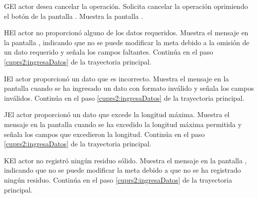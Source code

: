 \begin{UCtrayectoriaA}{G}{El actor desea cancelar la operación.}
	\UCpaso[\UCactor] Solicita cancelar la operación oprimiendo el botón  de la pantalla .
	\UCpaso[\UCsist] Muestra la pantalla  .
\end{UCtrayectoriaA} 

\begin{UCtrayectoriaA}{H}{El actor no proporcionó alguno de los datos requeridos.}
	\UCpaso[\UCsist] Muestra el mensaje  en la pantalla ,
	indicando que no se puede modificar la meta debido a la omisión de un dato requerido y señala los campos faltantes.
	\UCpaso[] Continúa en el paso \ref{cuprs2:ingresaDatos} de la trayectoria principal.
\end{UCtrayectoriaA}

\begin{UCtrayectoriaA}{I}{El actor proporcionó un dato que es incorrecto.}
	\UCpaso[\UCsist] Muestra el mensaje  en la pantalla 
	cuando se ha ingresado un dato con formato inválido y señala los campos inválidos.
	\UCpaso[] Continúa en el paso \ref{cuprs2:ingresaDatos} de la trayectoria principal.
\end{UCtrayectoriaA}
 
\begin{UCtrayectoriaA}{J}{El actor proporcionó un dato que excede la longitud máxima.}
	\UCpaso[\UCsist] Muestra el mensaje  en la pantalla 
	cuando se ha excedido la longitud máxima permitida y señala los campos que excedieron la longitud.
	\UCpaso[] Continúa en el paso \ref{cuprs2:ingresaDatos} de la trayectoria principal.
\end{UCtrayectoriaA}

\begin{UCtrayectoriaA}{K}{El actor no registró ningún residuo sólido.}
	\UCpaso[\UCsist] Muestra el mensaje  en la pantalla ,
	indicando que no se puede modificar la meta debido a que no se ha registrado ningún residuo.
	\UCpaso[] Continúa en el paso \ref{cuprs2:ingresaDatos} de la trayectoria principal.
\end{UCtrayectoriaA}
